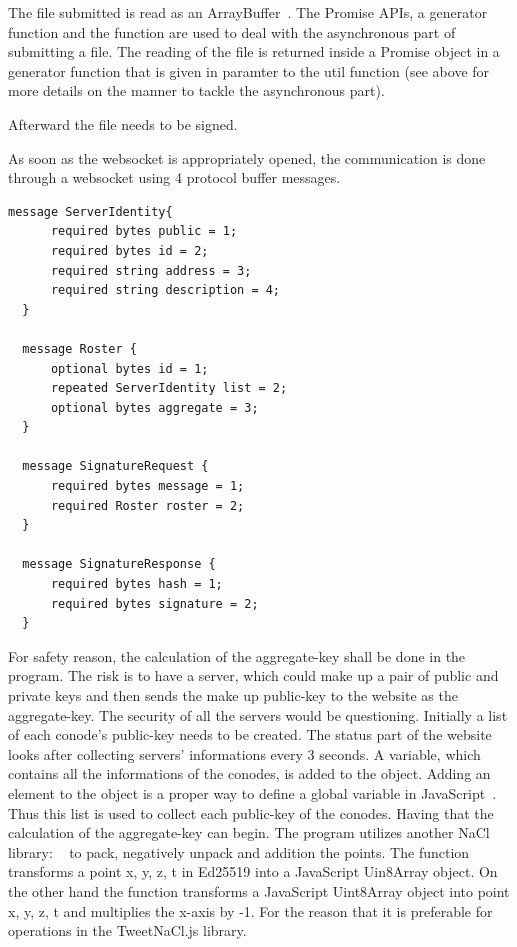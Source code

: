 \documentclass[11pt, a4paper, twoside, openright, openany]{article}
\begin{document}
The file submitted is read as an ArrayBuffer~\cite{ArrayBuffer}. The Promise APIs,
a generator function and the  function are used to deal with
the asynchronous part of submitting a file. The reading of the file is returned
inside a Promise object in a generator function that is given in paramter to the
 util function (see above for more details on
the manner to tackle the asynchronous part). %

Afterward the file needs to be signed.

As soon as the websocket is appropriately opened, the communication is done through a websocket
using 4 protocol buffer messages.
\bigbreak

\begin{lstlisting}[caption={.proto file}, captionpos=b]
  message ServerIdentity{
      required bytes public = 1;
      required bytes id = 2;
      required string address = 3;
      required string description = 4;
  }

  message Roster {
      optional bytes id = 1;
      repeated ServerIdentity list = 2;
      optional bytes aggregate = 3;
  }

  message SignatureRequest {
      required bytes message = 1;
      required Roster roster = 2;
  }

  message SignatureResponse {
      required bytes hash = 1;
      required bytes signature = 2;
  }
\end{lstlisting}

For safety reason, the calculation of the aggregate-key shall be done in the program.
The risk is to have a server, which could make up a pair of public and private keys and
then sends the make up public-key to the website as the aggregate-key. The security of
all the servers would be questioning.
\newline \newline
Initially a list of each conode's public-key needs to be created. The status part
of the website looks after collecting servers' informations every 3 seconds. A variable,
which contains all the informations of the conodes, is added to the  object.
Adding an element to the  object is a proper way to define a global variable
in JavaScript~\cite{globalVariable}. Thus this list is used to collect each public-key
of the conodes. Having that the calculation of the aggregate-key can begin.
The program utilizes another NaCl library: ~\cite{tweetNacl} to
pack, negatively unpack and addition the points. The function  transforms a point x, y, z, t in Ed25519
into a JavaScript Uin8Array object. On the other hand the function 
transforms a JavaScript Uint8Array object into point x, y, z, t and multiplies
the x-axis by -1. For the reason that it is preferable for operations in the TweetNaCl.js library.
\bigbreak
\end{document}
